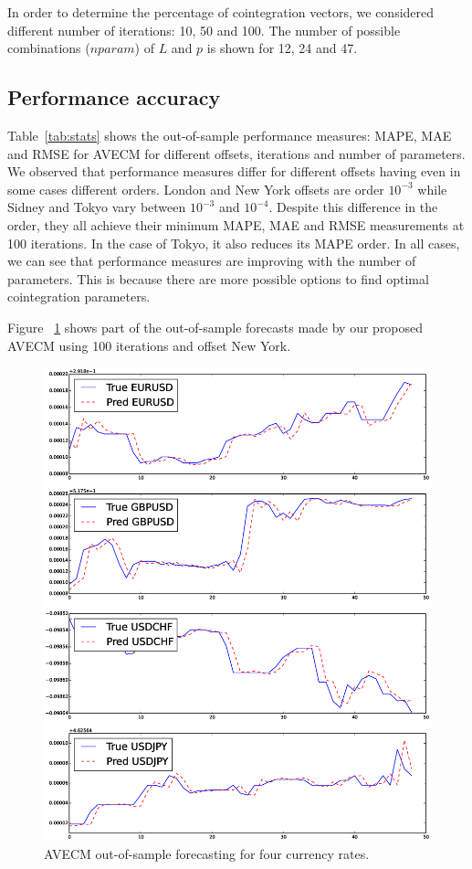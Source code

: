 In order to determine the percentage of cointegration vectors, we considered
different number of iterations: 10, 50 and 100. The number of possible
combinations ($nparam$) of $L$ and $p$ is shown for 12, 24 and 47.


\subsection{Performance accuracy} \label{sec:performacc}

Table~\ref{tab:stats} shows the out-of-sample performance measures: MAPE, MAE
and RMSE for AVECM for different offsets, iterations and number of parameters.
We observed that performance measures differ for different offsets having even
in some cases different orders. London and New York offsets are order $10^{-3}$
while Sidney and Tokyo vary between $10^{-3}$ and $10^{-4}$. Despite this
difference in the order, they all achieve their minimum MAPE, MAE and RMSE
measurements at 100 iterations. In the case of Tokyo, it also reduces its MAPE
order. In all cases, we can see that performance measures are improving with
the number of parameters.  This is because there are more possible options to find
optimal cointegration parameters.

Figure ~\ref{fig:accuracy} shows part of the out-of-sample forecasts made by
our proposed AVECM using 100 iterations and offset New York.

\begin{figure}[!h]
  \centering
  \includegraphics[width=\textwidth]{img/accuracy}
  \caption{AVECM out-of-sample forecasting for four currency rates.}
  \label{fig:accuracy}
\end{figure}


